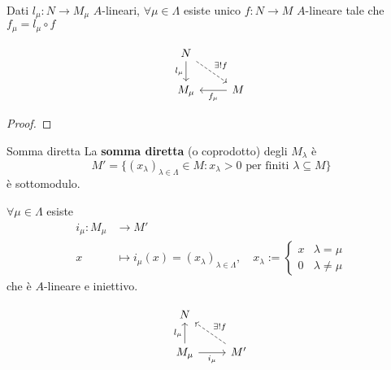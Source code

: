 \begin{proposition}
    Dati \(l_\mu : N \to M_\mu \) \(A\)-lineari, \(\forall \mu \in \Lambda\)
    esiste unico \(f : N\to M\) \(A\)-lineare tale che \(f_\mu = l_\mu \circ f\) 
\end{proposition}
\[\begin{tikzcd}
	N \\
	{M_\mu} & M
	\arrow["{l_\mu}"', from=1-1, to=2-1]
	\arrow["{\exists ! f}", dashed, from=1-1, to=2-2]
	\arrow["{f_\mu}", from=2-2, to=2-1]
\end{tikzcd}\]
\begin{proof}{}
\end{proof}

\begin{definition}{Somma diretta}
    La \textbf{somma diretta} (o coprodotto) degli \(M_{\lambda} \) è 
    \[
        M' = \{{(x_\lambda)}_{\lambda \in \Lambda} \in M : x_\lambda >0 \text{ per
  finiti \(\lambda\)} \subseteq M \}
    \]
    è sottomodulo.
\end{definition}

\(\forall \mu \in \Lambda\) esiste
\begin{align*}
    i_\mu: M_\mu &\longrightarrow M' \\
    x &\longmapsto i_\mu(x) = {(x_{\lambda} )}_{\lambda \in \Lambda}, \quad
    x_\lambda := \begin{cases}{}
        x & \lambda = \mu \\
        0 & \lambda \neq \mu
    \end{cases}
\end{align*}
che è \(A\)-lineare e iniettivo.

\begin{proposition}
\[\begin{tikzcd}
	N \\
	{M_\mu} & M'
	\arrow["{l_\mu}", from=2-1, to=1-1]
	\arrow["{i_\mu}"', from=2-1, to=2-2]
	\arrow["{\exists! f}"', dashed, from=2-2, to=1-1]
\end{tikzcd}\]
\end{proposition}

